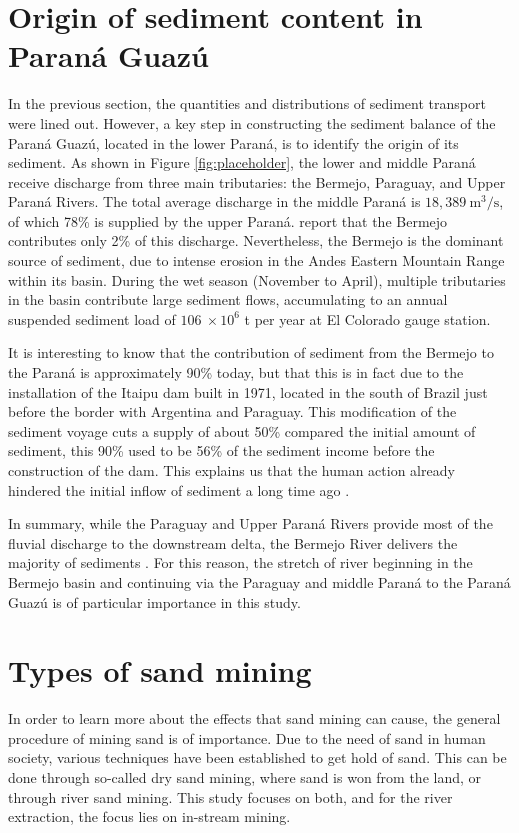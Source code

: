 \section{Origin of sediment content in Paraná Guazú}
\label{sec:origin sediment content}
In the previous section, the quantities and distributions of sediment transport were lined out. However, a key step in constructing the sediment balance of the Paraná Guazú, located in the lower Paraná, is to identify the origin of its sediment. As shown in Figure \ref{fig:placeholder}, the lower and middle Paraná receive discharge from three main tributaries: the Bermejo, Paraguay, and Upper Paraná Rivers. The total average discharge in the middle Paraná is $18,389~\mathrm{m^3/s}$, of which 78\% is supplied by the upper Paraná. \citeauthor{lopezweibelSourcesTemporalDynamics2022} report that the Bermejo contributes only 2\% of this discharge. Nevertheless, the Bermejo is the dominant source of sediment, due to intense erosion in the Andes Eastern Mountain Range within its basin. During the wet season (November to April), multiple tributaries in the basin contribute large sediment flows, accumulating to an annual suspended sediment load of $106 ~\times 10^6$ t per year at El Colorado gauge station. 

It is interesting to know that the contribution of sediment from the Bermejo to the Paraná is approximately 90\% today, but that this is in fact due to the installation of the Itaipu dam built in 1971, located in the south of Brazil just before the border with Argentina and Paraguay. This modification of the sediment voyage cuts a supply of about 50\% compared the initial amount of sediment, this 90\% used to be 56\% of the sediment income before the construction of the dam. This explains us that the human action already hindered the initial inflow of sediment a long time ago \autocite{hibaParanaRiverEcological2024}.

In summary, while the Paraguay and Upper Paraná Rivers provide most of the fluvial discharge to the downstream delta, the Bermejo River delivers the majority of sediments \autocite{lopezweibelSourcesTemporalDynamics2022}. For this reason, the stretch of river beginning in the Bermejo basin and continuing via the Paraguay and middle Paraná to the Paraná Guazú is of particular importance in this study.  

\section{Types of sand mining}
In order to learn more about the effects that sand mining can cause, the general procedure of mining sand is of importance. Due to the need of sand in human society, various techniques have been established to get hold of sand. This can be done through so-called dry sand mining, where sand is won from the land, or through river sand mining. This study focuses on both, and for the river extraction, the focus lies on in-stream mining.

